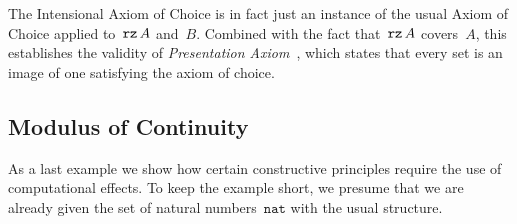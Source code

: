 The Intensional Axiom of Choice is in fact just an instance of the
usual Axiom of Choice applied to~$\texttt{rz}\,A$ and~$B$. Combined with the
fact that~$\texttt{rz}\,A$ covers~$A$, this establishes the validity of
\emph{Presentation Axiom}~\cite{barwise75:_admis_sets_struc}, which
states that every set is an image of one satisfying the axiom of
choice.

\subsection{Modulus of Continuity}
\label{sec:we-show-modulus-of-continuity-example}

As a last example we show how certain constructive principles require
the use of computational effects. To keep the example short, we
presume that we are already given the set of natural
numbers~$\mathtt{nat}$ with the usual structure.

